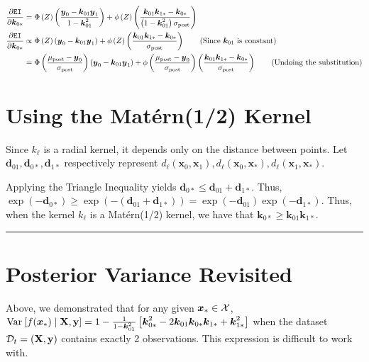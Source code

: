 \documentclass[11pt]{article}
\numberwithin{figure}{section}
\numberwithin{equation}{section}
\def\EI{\texttt{EI}}
\newcommand{\bs}[1]{\boldsymbol{#1}}
\def\bsx{\bs{x}}
\def\bsy{\bs{y}}
\def\bsk{\bs{k}}
\def\bsd{\bs{d}}
\def\bell{\bs{\ell}}
\def\xast{\bsx_{*}}
\def\Matern{\textrm{Mat\'{e}rn}}
\begin{document}
{\begin{align*}
\frac{\partial \EI}{\partial \bsk_{0*}} &= \Phi\left(Z\right)\left(\frac{\bsy_{0} - \bsk_{01}\bsy_{1}}{1 - \bsk_{01}^2}\right) + \phi\left(Z\right)\left(\frac{\bsk_{01}\bsk_{1*} - \bsk_{0*}}{\left(1 - \bsk_{01}^{2}\right)\sigma_{\textrm{post}}}\right)\\
\frac{\partial \EI}{\partial \bsk_{0*}} &\propto \Phi\left(Z\right)\left(\bsy_{0} - \bsk_{01}\bsy_{1}\right) + \phi\left(Z\right)\left(\frac{\bsk_{01}\bsk_{1*} - \bsk_{0*}}{\sigma_{\textrm{post}}}\right)\tag{Since $\bsk_{01}$ is constant}\\
&= \Phi\left(\frac{\mu_{\textrm{post}} - \bsy_{0}}{\sigma_{\textrm{post}}}\right)\left(\bsy_{0} - \bsk_{01}\bsy_{1}\right) + \phi\left(\frac{\mu_{\textrm{post}} - \bsy_{0}}{\sigma_{\textrm{post}}}\right)\left(\frac{\bsk_{01}\bsk_{1*} - \bsk_{0*}}{\sigma_{\textrm{post}}}\right)\tag{Undoing the substitution}\\
\end{align*}
}%

\newpage 

\section{Using the \Matern(1/2) Kernel}

Since $k_{\bell}$ is a radial kernel, it depends only on the distance between points. Let $\bsd_{01}, \bsd_{0*}, \bsd_{1*}$ respectively represent $d_{\bell}(\bsx_{0}, \bsx_{1}), d_{\bell}(\bsx_{0}, \xast), d_{\bell}(\bsx_{1}, \xast)$. 

Applying the Triangle Inequality yields $\bsd_{0*} \le \bsd_{01} + \bsd_{1*}$. Thus, $\exp(-\bsd_{0*}) \ge \exp\left(-\left(\bsd_{01} + \bsd_{1*}\right)\right) = \exp(-\bsd_{01})\exp(-\bsd_{1*})$. Thus, when the kernel $k_{\bell}$ is a \Matern(1/2) kernel, we have that $\bsk_{0*} \ge \bsk_{01}\bsk_{1*}$.
\noindent\rule{\textwidth}{0.8pt}

\section{Posterior Variance Revisited}
Above, we demonstrated that for any given $\xast \in \calX$, $\var{f(\xast) \mid \mathbf{X}, \mathbf{y}} = 1 - \frac{1}{1 - \bsk_{01}^{2}}\left[\bsk_{0*}^{2} - 2\bsk_{01}\bsk_{0*}\bsk_{1*} + \bsk_{1*}^{2}\right]$ when the dataset $\mathcal{D}_{t} = (\mathbf{X}, \mathbf{y})$ contains exactly 2 observations. This expression is difficult to work with.
\end{document}
